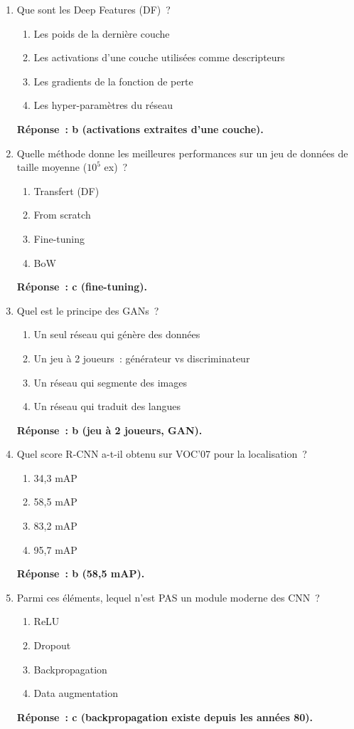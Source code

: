 \documentclass[a4paper,11pt]{article}
\theoremstyle{definition}
\theoremstyle{remark}
\begin{document}
\begin{enumerate}
  \item Que sont les Deep Features (DF)~?
    \begin{enumerate}
      \item Les poids de la derni\`ere couche
      \item Les activations d'une couche utilis\'ees comme
        descripteurs
      \item Les gradients de la fonction de perte
      \item Les hyper-param\`etres du r\'eseau
    \end{enumerate}
    \textbf{R\'eponse~: b (activations extraites d'une couche).}

  \item Quelle m\'ethode donne les meilleures performances sur un
    jeu de donn\'ees de taille moyenne ($10^5$ ex)~?
    \begin{enumerate}
      \item Transfert (DF)
      \item From scratch
      \item Fine-tuning
      \item BoW
    \end{enumerate}
    \textbf{R\'eponse~: c (fine-tuning).}

  \item Quel est le principe des GANs~?
    \begin{enumerate}
      \item Un seul r\'eseau qui g\'en\`ere des donn\'ees
      \item Un jeu \`a 2 joueurs~: g\'en\'erateur vs discriminateur
      \item Un r\'eseau qui segmente des images
      \item Un r\'eseau qui traduit des langues
    \end{enumerate}
    \textbf{R\'eponse~: b (jeu \`a 2 joueurs, GAN).}

  \item Quel score R-CNN a-t-il obtenu sur VOC'07 pour la
    localisation~?
    \begin{enumerate}
      \item 34{,}3 mAP
      \item 58{,}5 mAP
      \item 83{,}2 mAP
      \item 95{,}7 mAP
    \end{enumerate}
    \textbf{R\'eponse~: b (58{,}5 mAP).}

  \item Parmi ces \'el\'ements, lequel n'est PAS un module moderne
    des CNN~?
    \begin{enumerate}
      \item ReLU
      \item Dropout
      \item Backpropagation
      \item Data augmentation
    \end{enumerate}
    \textbf{R\'eponse~: c (backpropagation existe depuis les
    ann\'ees 80).}

\end{enumerate}
\end{document}
